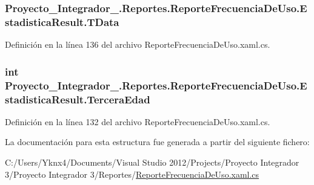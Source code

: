 \hypertarget{struct_proyecto___integrador__3_1_1_reportes_1_1_reporte_frecuencia_de_uso_1_1_estadistica_result_ad182093453a1c4839364affc65f7dbc7}{
\subsubsection[{T\-Data}]{ Proyecto\-\_\-\-Integrador\-\_.\-Reportes.\-Reporte\-Frecuencia\-De\-Uso.\-Estadistica\-Result.\-T\-Data}}\label{struct_proyecto___integrador__3_1_1_reportes_1_1_reporte_frecuencia_de_uso_1_1_estadistica_result_ad182093453a1c4839364affc65f7dbc7}


Definición en la línea 136 del archivo Reporte\-Frecuencia\-De\-Uso.\-xaml.\-cs.

\hypertarget{struct_proyecto___integrador__3_1_1_reportes_1_1_reporte_frecuencia_de_uso_1_1_estadistica_result_a1f03891dfd3acad9574d7336569a1163}{
\subsubsection[{Tercera\-Edad}]{\setlength{\rightskip}{0pt plus 5cm}int Proyecto\-\_\-\-Integrador\-\_.\-Reportes.\-Reporte\-Frecuencia\-De\-Uso.\-Estadistica\-Result.\-Tercera\-Edad}}\label{struct_proyecto___integrador__3_1_1_reportes_1_1_reporte_frecuencia_de_uso_1_1_estadistica_result_a1f03891dfd3acad9574d7336569a1163}


Definición en la línea 132 del archivo Reporte\-Frecuencia\-De\-Uso.\-xaml.\-cs.



La documentación para esta estructura fue generada a partir del siguiente fichero\-:\begin{DoxyCompactItemize}
\item 
C\-:/\-Users/\-Yknx4/\-Documents/\-Visual Studio 2012/\-Projects/\-Proyecto Integrador 3/\-Proyecto Integrador 3/\-Reportes/\hyperlink{_reporte_frecuencia_de_uso_8xaml_8cs}{Reporte\-Frecuencia\-De\-Uso.\-xaml.\-cs}\end{DoxyCompactItemize}
